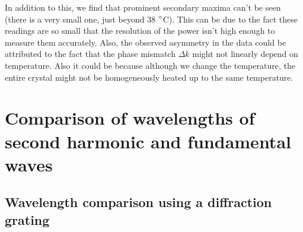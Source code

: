 In addition to this, we find that prominent secondary maxima can't be seen (there is a very small one, just beyond 38 $\degree$C). This can be due to the fact these readings are so small that the resolution of the power isn't high enough to measure them accurately. Also, the observed asymmetry in the data could be attributed to the fact that the phase mismatch $\Delta k$ might not linearly depend on temperature. Also it could be because although we change the temperature, the entire crystal might not be homogeneously heated up to the same temperature.
  
\section{Comparison of wavelengths of second harmonic and fundamental waves}
\subsection{Wavelength comparison using a diffraction grating}
 
